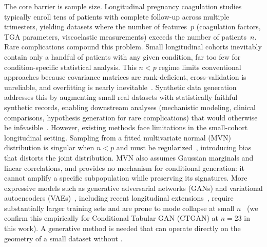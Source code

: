 The core barrier is sample size. Longitudinal pregnancy coagulation studies
typically enroll tens of patients with complete follow-up across multiple trimesters,
yielding datasets where the number of features~$p$ (coagulation factors, TGA
parameters, viscoelastic measurements) exceeds the number of patients~$n$. Rare
complications compound this problem. Small longitudinal cohorts inevitably contain
only a handful of patients with any given condition, far too few for
condition-specific statistical analysis. This $n < p$ regime limits conventional
approaches because covariance matrices are rank-deficient, cross-validation is
unreliable, and overfitting is nearly inevitable~\citep{Hastie2009}. Synthetic data generation addresses this by augmenting small real datasets with statistically faithful synthetic
records, enabling downstream analyses (mechanistic modeling, clinical comparisons,
hypothesis generation for rare complications) that would otherwise be
infeasible~\citep{Gonzales2023,Kuhnel2024}. However, existing methods face
limitations in the small-cohort longitudinal setting. Sampling from a fitted
multivariate normal (MVN) distribution is singular when $n < p$ and must be
regularized~\citep{Ledoit2004}, introducing bias that distorts the joint distribution.
MVN also assumes Gaussian marginals and linear correlations, and provides no mechanism
for conditional generation: it cannot amplify a specific subpopulation while preserving
its signatures. More expressive models such as generative adversarial networks (GANs) and
variational autoencoders (VAEs)~\citep{Goodfellow2014,Kingma2014,Xu2019CTGAN}, including recent longitudinal
extensions~\citep{Kuhnel2024}, require substantially larger training sets and are
prone to mode collapse at small $n$~\citep{DeMitri2025} (we confirm this empirically for Conditional Tabular GAN (CTGAN) at
$n{=}23$ in this work). A generative method is needed that can operate
directly on the geometry of a small dataset without .

